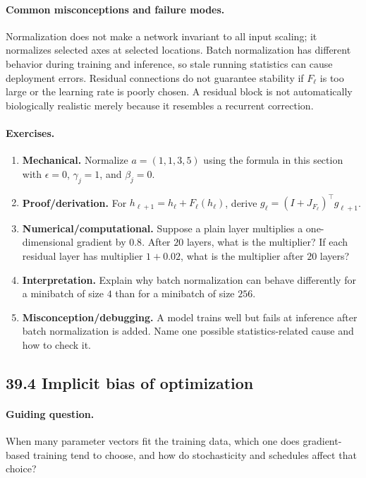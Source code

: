 \paragraph{Common misconceptions and failure modes.}
Normalization does not make a network invariant to all input scaling; it normalizes selected axes at selected locations. Batch normalization has different behavior during training and inference, so stale running statistics can cause deployment errors. Residual connections do not guarantee stability if \(F_\ell\) is too large or the learning rate is poorly chosen. A residual block is not automatically biologically realistic merely because it resembles a recurrent correction.

\paragraph{Exercises.}
\begin{enumerate}[label=\textbf{39.3.\arabic*.}, leftmargin=*]
\item \textbf{Mechanical.} Normalize \(a=(1,1,3,5)\) using the formula in this section with \(\epsilon=0\), \(\gamma_j=1\), and \(\beta_j=0\).
\item \textbf{Proof/derivation.} For \(h_{\ell+1}=h_\ell+F_\ell(h_\ell)\), derive \(g_\ell=(I+J_{F_\ell})^\top g_{\ell+1}\).
\item \textbf{Numerical/computational.} Suppose a plain layer multiplies a one-dimensional gradient by \(0.8\). After \(20\) layers, what is the multiplier? If each residual layer has multiplier \(1+0.02\), what is the multiplier after \(20\) layers?
\item \textbf{Interpretation.} Explain why batch normalization can behave differently for a minibatch of size \(4\) than for a minibatch of size \(256\).
\item \textbf{Misconception/debugging.} A model trains well but fails at inference after batch normalization is added. Name one possible statistics-related cause and how to check it.
\end{enumerate}

\subsection{39.4 Implicit bias of optimization}

\paragraph{Guiding question.}
When many parameter vectors fit the training data, which one does gradient-based training tend to choose, and how do stochasticity and schedules affect that choice?

